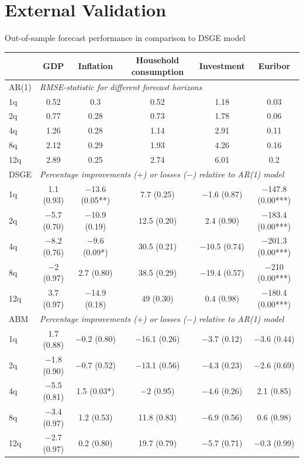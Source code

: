 \documentclass[9pt]{beamer}
\begin{document}
\section{External Validation}
\begin{frame}{Out-of-sample forecast performance in comparison to DSGE model}
    \centering
    \scriptsize
    \setlength{\tabcolsep}{4pt}
    \renewcommand{\arraystretch}{0.95}
    \begin{tabular}{lccccc}
        \toprule
             & GDP & Inflation & Household consumption & Investment & Euribor \\
        \midrule
        AR(1) & \multicolumn{5}{l}{\textit{RMSE-statistic for different forecast horizons}} \\
        1q   & 0.52 & 0.3  & 0.52 & 1.18 & 0.03 \\
        2q   & 0.77 & 0.28 & 0.73 & 1.78 & 0.06 \\
        4q   & 1.26 & 0.28 & 1.14 & 2.91 & 0.11 \\
        8q   & 2.12 & 0.29 & 1.93 & 4.26 & 0.16 \\
        12q  & 2.89 & 0.25 & 2.74 & 6.01 & 0.2  \\
        \midrule
        DSGE & \multicolumn{5}{l}{\textit{Percentage improvements ($+$) or losses ($-$) relative to AR(1) model}} \\
        1q   & 1.1 (0.93)    & $-$13.6 (0.05**) & 7.7 (0.25)  & $-$1.6 (0.87)  & $-$147.8 (0.00***) \\
        2q   & $-$5.7 (0.70) & $-$10.9 (0.19)   & 12.5 (0.20) & 2.4 (0.90)     & $-$183.4 (0.00***) \\
        4q   & $-$8.2 (0.76) & $-$9.6 (0.09*)   & 30.5 (0.21) & $-$10.5 (0.74) & $-$201.3 (0.00***) \\
        8q   & $-$2 (0.97)   & 2.7 (0.80)       & 38.5 (0.29) & $-$19.4 (0.57) & $-$210 (0.00***)   \\
        12q  & 3.7 (0.97)    & $-$14.9 (0.18)   & 49 (0.30)   & 0.4 (0.98)     & $-$180.4 (0.00***) \\
        \midrule
        ABM  & \multicolumn{5}{l}{\textit{Percentage improvements ($+$) or losses ($-$) relative to AR(1) model}} \\
        1q   & 1.7 (0.88)    & $-$0.2 (0.80)    & $-$16.1 (0.26) & $-$3.7 (0.12) & $-$3.6 (0.44) \\
        2q   & $-$1.8 (0.90) & $-$0.7 (0.52)    & $-$13.1 (0.56) & $-$4.3 (0.23) & $-$2.6 (0.69) \\
        4q   & $-$5.5 (0.81) & 1.5 (0.03*)      & $-$2 (0.95)    & $-$4.6 (0.26) & 2.1 (0.85)    \\
        8q   & $-$3.4 (0.97) & 1.2 (0.53)       & 11.8 (0.83)    & $-$6.9 (0.56) & 0.6 (0.98)    \\
        12q  & $-$2.7 (0.97) & 0.2 (0.80)       & 19.7 (0.79)    & $-$5.7 (0.71) & $-$0.3 (0.99) \\
        \bottomrule
    \end{tabular}


\end{frame}
\end{document}
